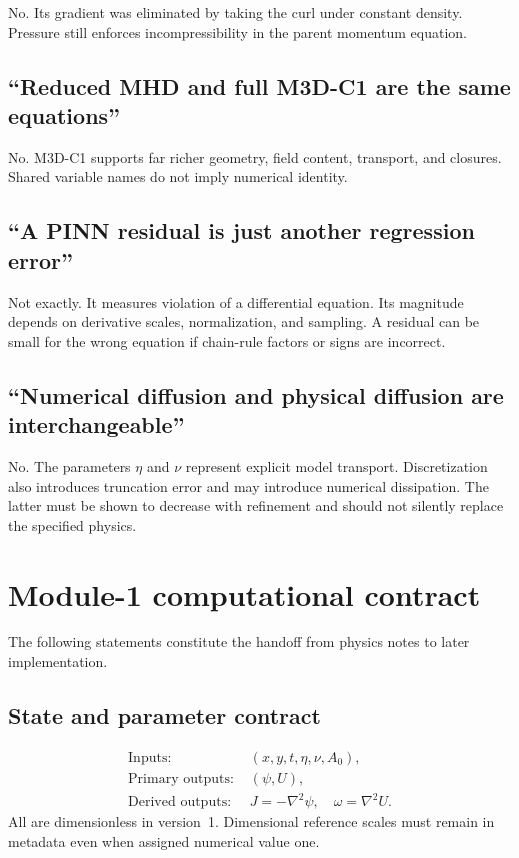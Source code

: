 \documentclass[11pt]{article}
\begin{document}
No. Its gradient was eliminated by taking the curl under constant density. Pressure still enforces incompressibility in the parent momentum equation.

\subsection{``Reduced MHD and full M3D-C1 are the same equations''}

No. M3D-C1 supports far richer geometry, field content, transport, and closures. Shared variable names do not imply numerical identity.

\subsection{``A PINN residual is just another regression error''}

Not exactly. It measures violation of a differential equation. Its magnitude depends on derivative scales, normalization, and sampling. A residual can be small for the wrong equation if chain-rule factors or signs are incorrect.

\subsection{``Numerical diffusion and physical diffusion are interchangeable''}

No. The parameters $\eta$ and $\nu$ represent explicit model transport. Discretization also introduces truncation error and may introduce numerical dissipation. The latter must be shown to decrease with refinement and should not silently replace the specified physics.

\section{Module-1 computational contract}
\label{sec:contract}

The following statements constitute the handoff from physics notes to later implementation.

\subsection{State and parameter contract}

\begin{align}
\text{Inputs: }&(x,y,t,\eta,\nu,A_0),\\
\text{Primary outputs: }&(\psi,U),\\
\text{Derived outputs: }&J=-\nabla^2\psi,\quad\omega=\nabla^2U.
\end{align}
All are dimensionless in version~1. Dimensional reference scales must remain in metadata even when assigned numerical value one.
\end{document}
